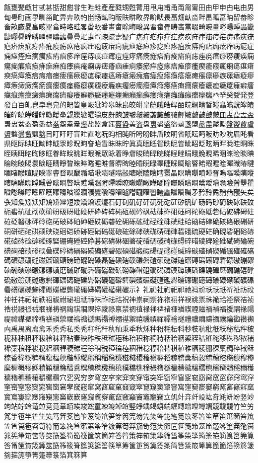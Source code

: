 甔甕甖甗甘甙甚甛甜甝甞生甠甡產産甤甥甦甧用甩甪甫甬甭甮甯田由甲申甴电甶男甸甹町画甼甽甾甿畀畁畂畃畄畅畆畇畈畉畊畋界畍畎畏畐畑畒畓畔畕畖畗畘留畚畛畜畝畞畟畠畡畢畣畤略畦畧畨畩番畫畬畭畮畯異畱畲畳畴畵當畷畸畹畺畻畼畽畾畿疀疁疂疃疄疅疆疇疈疉疊疋疌疍疎疏疐疑疒疓疔疕疖疗疘疙疚疛疜疝疞疟疠疡疢疣疤疥疦疧疨疩疪疫疬疭疮疯疰疱疲疳疴疵疶疷疸疹疺疻疼疽疾疿痀痁痂痃痄病痆症痈痉痊痋痌痍痎痏痐痑痒痓痔痕痖痗痘痙痚痛痜痝痞痟痠痡痢痣痤痥痦痧痨痩痪痫痬痭痮痯痰痱痲痳痴痵痶痷痸痹痺痻痼痽痾痿瘀瘁瘂瘃瘄瘅瘆瘇瘈瘉瘊瘋瘌瘍瘎瘏瘐瘑瘒瘓瘔瘕瘖瘗瘘瘙瘚瘛瘜瘝瘞瘟瘠瘡瘢瘣瘤瘥瘦瘧瘨瘩瘪瘫瘬瘭瘮瘯瘰瘱瘲瘳瘴瘵瘶瘷瘸瘹瘺瘻瘼瘽瘾瘿癀癁療癃癄癅癆癇癈癉癊癋癌癍癎癏癐癑癒癓癔癕癖癗癘癙癚癛癜癝癞癟癠癡癢癣癤癥癦癧癨癩癪癫癬癭癮癯癰癱癲癳癴癵癶癷癸癹発登發白百癿皀皁皂皃的皅皆皇皈皉皊皋皌皍皎皏皐皑皒皓皔皕皖皗皘皙皚皛皜皝皞皟皠皡皢皣皤皥皦皧皨皩皪皫皬皭皮皯皰皱皲皳皴皵皶皷皸皹皺皻皼皽皾皿盀盁盂盃盄盅盆盇盈盉益盋盌盍盎盏盐监盒盓盔盕盖盗盘盙盚盛盜盝盞盟盠盡盢監盤盥盦盧盨盩盪盫盬盭目盯盰盱盲盳直盵盶盷相盹盺盻盼盽盾盿眀省眂眃眄眅眆眇眈眉眊看県眍眎眏眐眑眒眓眔眕眖眗眘眙眚眛眜眝眞真眠眡眢眣眤眥眦眧眨眩眪眫眬眭眮眯眰眱眲眳眴眵眶眷眸眹眺眻眼眽眾眿着睁睂睃睄睅睆睇睈睉睊睋睌睍睎睏睐睑睒睓睔睕睖睗睘睙睚睛睜睝睞睟睠睡睢督睤睥睦睧睨睩睪睫睬睭睮睯睰睱睲睳睴睵睶睷睸睹睺睻睼睽睾睿瞀瞁瞂瞃瞄瞅瞆瞇瞈瞉瞊瞋瞌瞍瞎瞏瞐瞑瞒瞓瞔瞕瞖瞗瞘瞙瞚瞛瞜瞝瞞瞟瞠瞡瞢瞣瞤瞥瞦瞧瞨瞩瞪瞫瞬瞭瞮瞯瞰瞱瞲瞳瞴瞵瞶瞷瞸瞹瞺瞻瞼瞽瞾瞿矀矁矂矃矄矅矆矇矈矉矊矋矌矍矎矏矐矑矒矓矔矕矖矗矘矙矚矛矜矝矞矟矠矡矢矣矤知矦矧矨矩矪矫矬短矮矯矰矱矲石矴矵矶矷矸矹矺矻矼矽矾矿砀码砂砃砄砅砆砇砈砉砊砋砌砍砎砏砐砑砒砓研砕砖砗砘砙砚砛砜砝砞砟砠砡砢砣砤砥砦砧砨砩砪砫砬砭砮砯砰砱砲砳破砵砶砷砸砹砺砻砼砽砾砿础硁硂硃硄硅硆硇硈硉硊硋硌硍硎硏硐硑硒硓硔硕硖硗硘硙硚硛硜硝硞硟硠硡硢硣硤硥硦硧硨硩硪硫硬硭确硯硰硱硲硳硴硵硶硷硸硹硺硻硼硽硾硿碀碁碂碃碄碅碆碇碈碉碊碋碌碍碎碏碐碑碒碓碔碕碖碗碘碙碚碛碜碝碞碟碠碡碢碣碤碥碦碧碨碩碪碫碬碭碮碯碰碱碲碳碴碵碶碷碸碹確碻碼碽碾碿磀磁磂磃磄磅磆磇磈磉磊磋磌磍磎磏磐磑磒磓磔磕磖磗磘磙磚磛磜磝磞磟磠磡磢磣磤磥磦磧磨磩磪磫磬磭磮磯磰磱磲磳磴磵磶磷磸磹磺磻磼磽磾磿礀礁礂礃礄礅礆礇礈礉礊礋礌礍礎礏礐礑礒礓礔礕礖礗礘礙礚礛礜礝礞礟礠礡礢礣礤礥礦礧礨礩礪礫礬礭礮礯礰礱礲礳礴礵礶礷礸礹示礻礼礽社礿祀祁祂祃祄祅祆祇祈祉祊祋祌祍祎祏祐祑祒祓祔祕祖祗祘祙祚祛祜祝神祟祠祡祢祣祤祥祦祧票祩祪祫祬祭祮祯祰祱祲祳祴祵祶祷祸祹祺祻祼祽祾祿禀禁禂禃禄禅禆禇禈禉禊禋禌禍禎福禐禑禒禓禔禕禖禗禘禙禚禛禜禝禞禟禠禡禢禣禤禥禦禧禨禩禪禫禬禭禮禯禰禱禲禳禴禵禶禷禸禹禺离禼禽禾禿秀私秂秃秄秅秆秇秈秉秊秋秌种秎秏秐科秒秓秔秕秖秗秘秙秚秛秜秝秞租秠秡秢秣秤秥秦秧秨秩秪秫秬秭秮积称秱秲秳秴秵秶秷秸秹秺移秼秽秾秿稀稁稂稃稄稅稆稇稈稉稊程稌稍税稏稐稑稒稓稔稕稖稗稘稙稚稛稜稝稞稟稠稡稢稣稤稥稦稧稨稩稪稫稬稭種稯稰稱稲稳稴稵稶稷稸稹稺稻稼稽稾稿穀穁穂穃穄穅穆穇穈穉穊穋穌積穎穏穐穑穒穓穔穕穖穗穘穙穚穛穜穝穞穟穠穡穢穣穤穥穦穧穨穩穪穫穬穭穮穯穰穱穲穳穴穵究穷穸穹空穻穼穽穾穿窀突窂窃窄窅窆窇窈窉窊窋窌窍窎窏窐窑窒窓窔窕窖窗窘窙窚窛窜窝窞窟窠窡窢窣窤窥窦窧窨窩窪窫窬窭窮窯窰窱窲窳窴窵窶窷窸窹窺窻窼窽窾窿竀竁竂竃竄竅竆竇竈竉竊立竌竍竎竏竐竑竒竓竔竕竖竗竘站竚竛竜竝竞竟章竡竢竣竤童竦竧竨竩竪竫竬竭竮端竰竱竲竳竴竵競竷竸竹竺竻竼竽竾竿笀笁笂笃笄笅笆笇笈笉笊笋笌笍笎笏笐笑笒笓笔笕笖笗笘笙笚笛笜笝笞笟笠笡笢笣笤笥符笧笨笩笪笫第笭笮笯笰笱笲笳笴笵笶笷笸笹笺笻笼笽笾笿筀筁筂筃筄筅筆筇筈等筊筋筌筍筎筏筐筑筒筓答筕策筗筘筙筚筛筜筝筞筟筠筡筢筣筤筥筦筧筨筩筪筫筬筭筮筯筰筱筲筳筴筵筶筷筸筹筺筻筼筽签筿简箁箂箃箄箅箆箇箈箉箊箋箌箍箎箏箐箑箒箓箔箕箖算